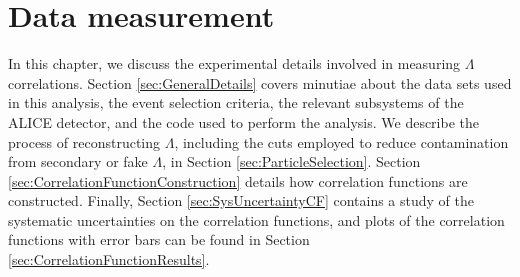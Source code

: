 \chapter{Data measurement}
\label{sec:DataMeasurement}

In this chapter, we discuss the experimental details involved in measuring $\Lambda$ correlations.
Section \ref{sec:GeneralDetails} covers minutiae about the data sets used in this analysis, the event selection criteria, the relevant subsystems of the ALICE detector, and the code used to perform the analysis.
We describe the process of reconstructing $\Lambda$, including the cuts employed to reduce contamination from secondary or fake $\Lambda$, in Section \ref{sec:ParticleSelection}.
Section \ref{sec:CorrelationFunctionConstruction} details how correlation functions are constructed.
Finally, Section \ref{sec:SysUncertaintyCF} contains a study of the systematic uncertainties on the correlation functions, and plots of the correlation functions with error bars can be found in Section \ref{sec:CorrelationFunctionResults}.





